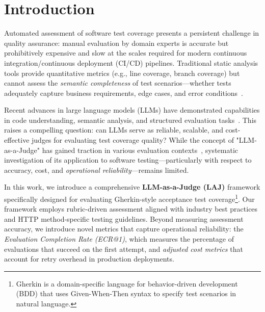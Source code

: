 \documentclass[letterpaper]{article} %
\begin{document}
\section{Introduction}

Automated assessment of software test coverage presents a persistent challenge in quality assurance: manual evaluation by domain experts is accurate but prohibitively expensive and slow at the scales required for modern continuous integration/continuous deployment (CI/CD) pipelines. Traditional static analysis tools provide quantitative metrics (e.g., line coverage, branch coverage) but cannot assess the \textit{semantic completeness} of test scenarios---whether tests adequately capture business requirements, edge cases, and error conditions~\cite{karpurapu2024comprehensive}.

Recent advances in large language models (LLMs) have demonstrated capabilities in code understanding, semantic analysis, and structured evaluation tasks~\cite{alshahwan2024automated}. This raises a compelling question: can LLMs serve as reliable, scalable, and cost-effective judges for evaluating test coverage quality? While the concept of "LLM-as-a-Judge" has gained traction in various evaluation contexts~\cite{zheng2023judging}, systematic investigation of its application to software testing---particularly with respect to accuracy, cost, and \textit{operational reliability}---remains limited.

In this work, we introduce a comprehensive \textbf{LLM-as-a-Judge (LAJ)} framework specifically designed for evaluating Gherkin-style acceptance test coverage\footnote{Gherkin is a domain-specific language for behavior-driven development (BDD) that uses Given-When-Then syntax to specify test scenarios in natural language.}. Our framework employs rubric-driven assessment aligned with industry best practices and HTTP method-specific testing guidelines. Beyond measuring assessment accuracy, we introduce novel metrics that capture operational reliability: the \textit{Evaluation Completion Rate (ECR@1)}, which measures the percentage of evaluations that succeed on the first attempt, and \textit{adjusted cost metrics} that account for retry overhead in production deployments.
\end{document}

